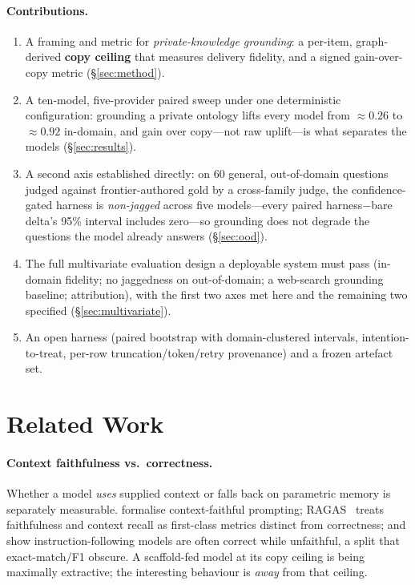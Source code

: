 \documentclass[11pt]{article}
\begin{document}
\paragraph{Contributions.}
\begin{enumerate}[topsep=2pt,itemsep=1pt]
\item A framing and metric for \emph{private-knowledge grounding}: a per-item, graph-derived
\textbf{copy ceiling} that measures delivery fidelity, and a signed gain-over-copy metric
(\S\ref{sec:method}).
\item A ten-model, five-provider paired sweep under one deterministic configuration: grounding a
private ontology lifts every model from $\approx0.26$ to $\approx0.92$ in-domain, and gain over
copy---not raw uplift---is what separates the models (\S\ref{sec:results}).
\item A second axis established directly: on 60 general, out-of-domain questions judged against
frontier-authored gold by a cross-family judge, the confidence-gated harness is \emph{non-jagged}
across five models---every paired harness$-$bare delta's 95\% interval includes zero---so grounding
does not degrade the questions the model already answers (\S\ref{sec:ood}).
\item The full multivariate evaluation design a deployable system must pass (in-domain fidelity;
no jaggedness on out-of-domain; a web-search grounding baseline; attribution), with the first two
axes met here and the remaining two specified (\S\ref{sec:multivariate}).
\item An open harness (paired bootstrap with domain-clustered intervals,
intention-to-treat, per-row truncation/token/retry provenance) and a frozen artefact set.
\end{enumerate}

\section{Related Work}\label{sec:related}
\paragraph{Context faithfulness vs.\ correctness.}
Whether a model \emph{uses} supplied context or falls back on parametric memory is separately
measurable. \textcite{zhou2023contextfaithful} formalise context-faithful prompting;
RAGAS~\cite{es2023ragas} treats faithfulness and context recall as first-class metrics distinct
from correctness; and \textcite{adlakha2024evaluating} show instruction-following models are
often correct while unfaithful, a split that exact-match/F1 obscure. A scaffold-fed model at its
copy ceiling is being maximally extractive; the interesting behaviour is \emph{away} from that
ceiling.
\end{document}
